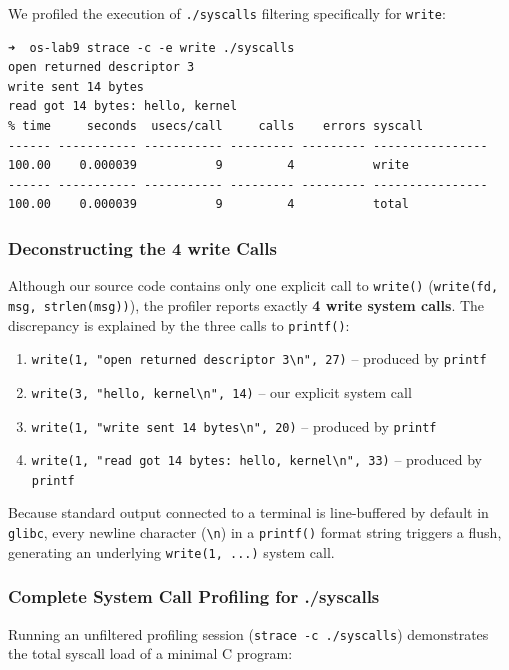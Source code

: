 \documentclass{labreport}
\begin{document}
We profiled the execution of \texttt{./syscalls} filtering specifically for \texttt{write}:

\begin{lstlisting}[style=bash]
➜  os-lab9 strace -c -e write ./syscalls
open returned descriptor 3
write sent 14 bytes
read got 14 bytes: hello, kernel
% time     seconds  usecs/call     calls    errors syscall
------ ----------- ----------- --------- --------- ----------------
100.00    0.000039           9         4           write
------ ----------- ----------- --------- --------- ----------------
100.00    0.000039           9         4           total
\end{lstlisting}

\subsubsection{Deconstructing the 4 write Calls}
Although our source code contains only one explicit call to \texttt{write()} (\texttt{write(fd, msg, strlen(msg))}), the profiler reports exactly \textbf{4 write system calls}.
The discrepancy is explained by the three calls to \texttt{printf()}:
\begin{enumerate}[noitemsep]
    \item \texttt{write(1, "open returned descriptor 3\textbackslash n", 27)} -- produced by \texttt{printf}
    \item \texttt{write(3, "hello, kernel\textbackslash n", 14)} -- our explicit system call
    \item \texttt{write(1, "write sent 14 bytes\textbackslash n", 20)} -- produced by \texttt{printf}
    \item \texttt{write(1, "read got 14 bytes: hello, kernel\textbackslash n", 33)} -- produced by \texttt{printf}
\end{enumerate}
Because standard output connected to a terminal is line-buffered by default in \texttt{glibc}, every newline character (\texttt{\textbackslash n}) in a \texttt{printf()} format string triggers a flush, generating an underlying \texttt{write(1, ...)} system call.

\subsubsection{Complete System Call Profiling for ./syscalls}
Running an unfiltered profiling session (\texttt{strace -c ./syscalls}) demonstrates the total syscall load of a minimal C program:
\end{document}
